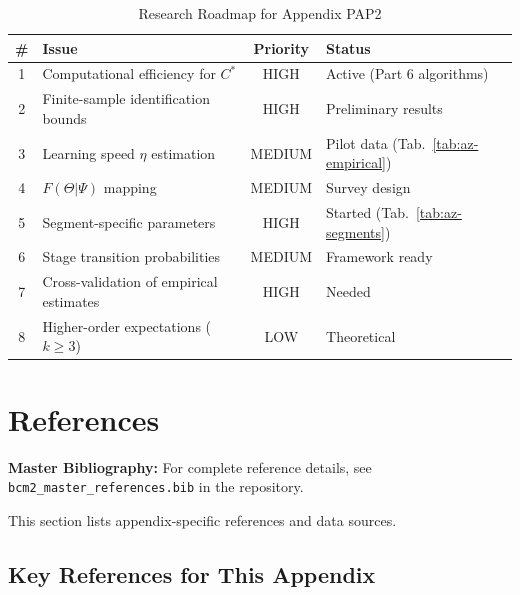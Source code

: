 \begin{table}[htbp]
\centering
\caption{Research Roadmap for Appendix PAP2}
\label{tab:az-roadmap}
\renewcommand{\arraystretch}{1.3}
\begin{tabular}{@{}clcl@{}}
\toprule
\textbf{\#} & \textbf{Issue} & \textbf{Priority} & \textbf{Status} \\
\midrule
1 & Computational efficiency for $C^*$ & HIGH & Active (Part 6 algorithms) \\
2 & Finite-sample identification bounds & HIGH & Preliminary results \\
3 & Learning speed $\eta$ estimation & MEDIUM & Pilot data (Tab.~\ref{tab:az-empirical}) \\
4 & $F(\Theta|\Psi)$ mapping & MEDIUM & Survey design \\
5 & Segment-specific parameters & HIGH & Started (Tab.~\ref{tab:az-segments}) \\
6 & Stage transition probabilities & MEDIUM & Framework ready \\
7 & Cross-validation of empirical estimates & HIGH & Needed \\
8 & Higher-order expectations ($k \geq 3$) & LOW & Theoretical \\
\bottomrule
\end{tabular}
\end{table}


\section{References}

\nocite{bcm_master}

\label{sec:az-references}

\begin{tcolorbox}[colback=blue!5!white, colframe=blue!75!black]
\textbf{Master Bibliography:} For complete reference details, see
\texttt{bcm2\_master\_references.bib} in the repository.

This section lists appendix-specific references and data sources.
\end{tcolorbox}

\vspace{0.5em}

\subsection{Key References for This Appendix}

